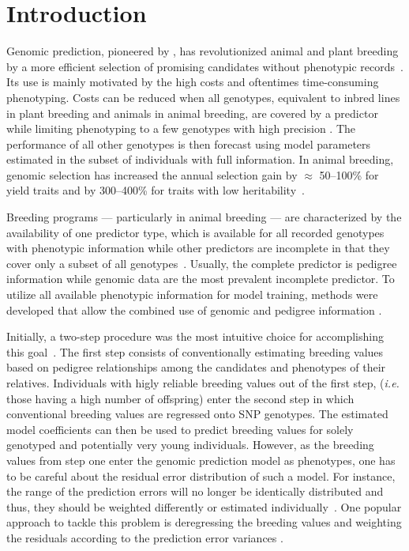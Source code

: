 \documentclass[12pt,titlepage]{article}
\begin{document}
\section{Introduction}
Genomic prediction, pioneered by , has revolutionized
animal and plant breeding by a more efficient selection of promising candidates 
without phenotypic records~\cite{DeLosCampos2013,Garcia-Ruiz2016}.
Its use is mainly motivated by the high costs and oftentimes time-consuming
phenotyping.
Costs can be reduced when all genotypes, equivalent to inbred lines in plant
breeding and animals in animal breeding, are covered by a predictor while
limiting phenotyping to a few genotypes with high precision \cite{Kadam2016}.
The performance of all other genotypes is then forecast using model parameters
estimated in the subset of individuals with full information.
In animal breeding, genomic selection has increased the annual selection gain 
by $\approx$ 50--100\% for yield traits and by 300--400\% for traits with low 
heritability~\cite{Garcia-Ruiz2016}.

Breeding programs --- particularly in animal breeding --- are characterized by
the availability of one predictor type, which is available for all recorded
genotypes with phenotypic information while other predictors are incomplete in
that they cover only a subset of all genotypes~\cite{Fragomeni2015}.
Usually, the complete predictor is pedigree information while genomic data are
the most prevalent incomplete predictor.
To utilize all available phenotypic information for model training, methods were 
developed that allow the combined use of genomic and pedigree information 
\cite{Hayes2009a,VanRaden2009}.

Initially, a two-step procedure was the most intuitive choice for accomplishing
this goal~\cite{VanRaden2009}.
The first step consists of conventionally estimating breeding values based on
pedigree relationships among the candidates and phenotypes of their relatives.
Individuals with higly reliable breeding values out of the first step,
(\textit{i.e.} those having a high number of offspring) enter the second step in
which conventional breeding values are regressed onto SNP genotypes.
The estimated model coefficients can then be used to predict breeding values
for solely genotyped and potentially very young individuals.
However, as the breeding values from step one enter the genomic prediction
model as phenotypes, one has to be careful about the residual error
distribution of such a model.
For instance, the range of the prediction errors will no longer be identically
distributed and thus, they should be weighted differently or estimated 
individually~\cite{Aguilar2010}.
One popular approach to tackle this problem is deregressing the breeding
values and weighting the residuals according to the prediction error variances
\cite{Garrick2009}.
\end{document}
